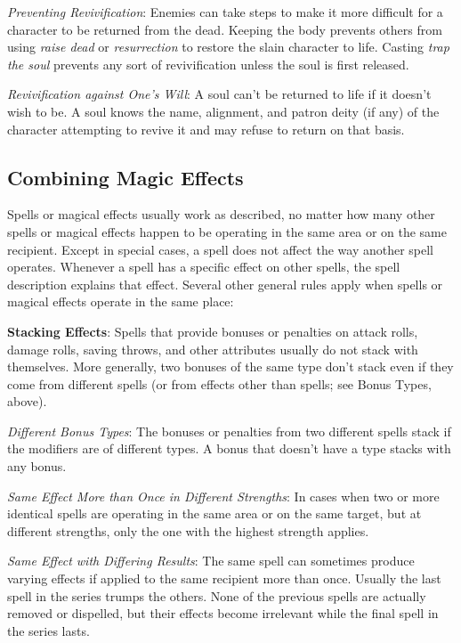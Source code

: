 \textit{Preventing Revivification}: Enemies can take steps to make it more difficult for a character to be returned from the dead. Keeping the body prevents others from using \textit{raise dead }or \textit{resurrection }to restore the slain character to life. Casting \textit{trap the soul }prevents any sort of revivification unless the soul is first released.
				
\textit{Revivification against One's Will}: A soul can't be returned to life if it doesn't wish to be. A soul knows the name, alignment, and patron deity (if any) of the character attempting to revive it and may refuse to return on that basis.
				
\subsection{Combining Magic Effects}

				
Spells or magical effects usually work as described, no matter how many other spells or magical effects happen to be operating in the same area or on the same recipient. Except in special cases, a spell does not affect the way another spell operates. Whenever a spell has a specific effect on other spells, the spell description explains that effect. Several other general rules apply when spells or magical effects operate in the same place:
				
\textbf{Stacking Effects}: Spells that provide bonuses or penalties on attack rolls, damage rolls, saving throws, and other attributes usually do not stack with themselves. More generally, two bonuses of the same type don't stack even if they come from different spells (or from effects other than spells; see Bonus Types, above). 
				
\textit{Different Bonus Types}: The bonuses or penalties from two different spells stack if the modifiers are of different types. A bonus that doesn't have a type stacks with any bonus.
				
\textit{Same Effect More than Once in Different Strengths}: In cases when two or more identical spells are operating in the same area or on the same target, but at different strengths, only the one with the highest strength applies.
				
\textit{Same Effect with Differing Results}: The same spell can sometimes produce varying effects if applied to the same recipient more than once. Usually the last spell in the series trumps the others. None of the previous spells are actually removed or dispelled, but their effects become irrelevant while the final spell in the series lasts.
				
